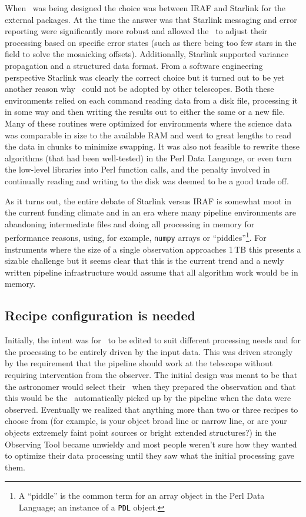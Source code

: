 \documentclass[final,authoryear,5p,times,twocolumn]{elsarticle}
\begin{document}
When \oracdr\ was being designed the choice was between IRAF
\citep[][]{2012ASPC..461..595F} and Starlink for the
external packages.
At the time the answer was that Starlink messaging and error reporting were
significantly more robust and allowed the \primitives\ to adjust their
processing based on specific error states (such as there being too few
stars in the field to solve the mosaicking offsets). Additionally,
Starlink supported variance propagation and a structured data format.
From a software
engineering perspective Starlink was clearly the correct choice but it
turned out to be yet another reason why \oracdr\ could not be adopted
by other telescopes. Both these environments relied on each command
reading data from a disk file, processing it in some way and then
writing the results out to either the same or a new file. Many of
these routines were optimized for environments where the science data
was comparable in size to the available RAM and went to great lengths
to read the data in chunks to minimize swapping. It was also not
feasible to rewrite these algorithms (that had been well-tested) in
the Perl Data Language, or even turn the low-level libraries into Perl
function calls, and the penalty involved in continually reading
and writing to the disk was deemed to be a good trade off.

As it turns out, the entire debate of Starlink versus IRAF is somewhat
moot in the current funding climate and in an era where many pipeline
environments \citep[e.g.,][]{2010SPIE.7740E..15A} are abandoning
intermediate files and doing all processing in memory for performance
reasons, using, for example, \texttt{numpy} arrays or ``piddles''\footnote{A
 ``piddle'' is the common term for an array object in the Perl Data Language;
 an instance of a \texttt{PDL} object.}. For
instruments where the size of a single observation approaches 1\,TB
\citep[e.g., SWCam at CCAT;][]{2014SPIE9153-21} this presents a
sizable challenge but it seems clear that this is the current trend
and a newly written pipeline infrastructure would assume that all
algorithm work would be in memory.

\subsection{Recipe configuration is needed}

Initially, the intent was for \recipes\ to be edited to suit different
processing needs and for the processing to be entirely driven by the
input data. This was driven strongly by the requirement that the
pipeline should work at the telescope without requiring intervention
from the observer. The initial design was meant to be that the
astronomer would select their \recipe\ when they prepared the
observation and that this would be the \recipe\ automatically picked
up by the pipeline when the data were observed. Eventually we realized
that anything more than two or three recipes to choose from (for
example, is your object broad line or narrow line, or are your objects
extremely faint point sources or bright extended structures?) in the
Observing Tool became unwieldy and most people weren't sure how they
wanted to optimize their data processing until they saw what the
initial processing gave them.
\end{document}
